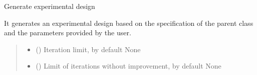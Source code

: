 \documentclass[a4paper,10pt,english]{sphinxhowto}
\begin{document}
\begin{fulllineitems}
\begin{fulllineitems}
\label{\detokenize{generated/portchoice.design:portchoice.design.PortDesign.generate_design}}
\pysigstartsignatures
{}
\pysigstopsignatures
\sphinxAtStartPar
Generate experimental design

\sphinxAtStartPar
It generates an experimental design based on the specification
of the parent class and the parameters provided by the user.
\begin{quote}\begin{description}
\begin{itemize}
\item {} 
\sphinxAtStartPar
{} (\sphinxstyleliteralemphasis{\sphinxupquote{, }}) \textendash{} Iteration limit, by default None

\item {} 
\sphinxAtStartPar
{} (\sphinxstyleliteralemphasis{\sphinxupquote{, }}) \textendash{} Limit of iterations without improvement, by default None


\end{itemize}
\end{description}
\end{quote}
\end{fulllineitems}
\end{fulllineitems}
\end{document}
